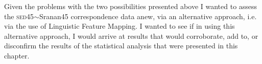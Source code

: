 Given the problems with the two possibilities presented above I wanted to assess the  \textsc{sed45}$\sim$Sranan45 correspondence data anew, via an alternative approach, i.e. via the use of Linguistic Feature Mapping. I wanted to see if in using this alternative approach, I would arrive at results that would corroborate, add to, or disconfirm the results of the statistical analysis that were presented in this chapter.
